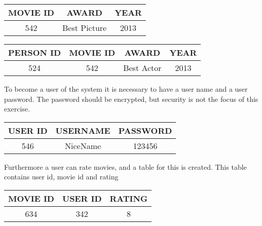 \documentclass[10pt,a4paper,final]{report}
\begin{document}
\begin{table}[H] \centering
\begin{tabular}{|c|c|c|}
\hline 
MOVIE ID & AWARD & YEAR \\ 
\hline 
542 & Best Picture & 2013 \\ 
\hline 
\end{tabular} 
\end{table}

\begin{table}[H] \centering
\begin{tabular}{|c|c|c|c|}
\hline 
PERSON ID & MOVIE ID & AWARD & YEAR\\ 
\hline 
524 & 542 & Best Actor & 2013 \\ 
\hline 
\end{tabular} 
\end{table}

To become a user of the system it is necessary to have a user name and a user password. The password should be encrypted, but security is not the focus of this exercise.

\begin{table}[H] \centering
\begin{tabular}{|c|c|c|}
\hline 
USER ID & USERNAME & PASSWORD \\ 
\hline 
546 & NiceName & 123456 \\ 
\hline 
\end{tabular} 
\end{table}

Furthermore a user can rate movies, and a table for this is created. This table contains user id, movie id and rating

\begin{table}[H] \centering
\begin{tabular}{|c|c|c|}
\hline 
MOVIE ID & USER ID & RATING \\ 
\hline 
634 & 342 & 8 \\ 
\hline 
\end{tabular} 
\end{table}
\end{document}

